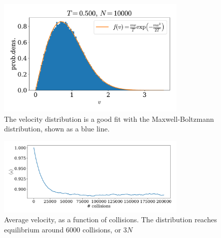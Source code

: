 \documentclass{article}
\begin{document}
            \begin{figure}
                \centering
                \includegraphics[width=0.8\textwidth]{../plots/problem1/vel_dist.pdf}
                \caption{The velocity distribution is a good fit with the Maxwell-Boltzmann distribution, shown as a blue line.}
                \label{problem1 dist}
            \end{figure}
            \begin{figure}
                \centering
                \includegraphics[width=0.8\textwidth]{../plots/problem1/v_av.pdf}
                \caption{Average velocity, as a function of collisions. The distribution reaches equilibrium around $6000$ collisions, or $3N$}
                \label{problem1 av vel}
            \end{figure}
    

    
       
\end{document}
